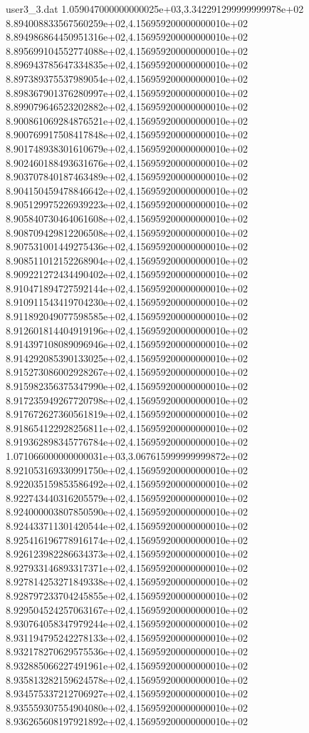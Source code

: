 \begin{filecontents}{user3_3.dat}
1.059047000000000025e+03,3.342291299999999978e+02
8.894008833567560259e+02,4.156959200000000010e+02
8.894986864450951316e+02,4.156959200000000010e+02
8.895699104552774088e+02,4.156959200000000010e+02
8.896943785647334835e+02,4.156959200000000010e+02
8.897389375537989054e+02,4.156959200000000010e+02
8.898367901376280997e+02,4.156959200000000010e+02
8.899079646523202882e+02,4.156959200000000010e+02
8.900861069284876521e+02,4.156959200000000010e+02
8.900769917508417848e+02,4.156959200000000010e+02
8.901748938301610679e+02,4.156959200000000010e+02
8.902460188493631676e+02,4.156959200000000010e+02
8.903707840187463489e+02,4.156959200000000010e+02
8.904150459478846642e+02,4.156959200000000010e+02
8.905129975226939223e+02,4.156959200000000010e+02
8.905840730464061608e+02,4.156959200000000010e+02
8.908709429812206508e+02,4.156959200000000010e+02
8.907531001449275436e+02,4.156959200000000010e+02
8.908511012152268904e+02,4.156959200000000010e+02
8.909221272434490402e+02,4.156959200000000010e+02
8.910471894727592144e+02,4.156959200000000010e+02
8.910911543419704230e+02,4.156959200000000010e+02
8.911892049077598585e+02,4.156959200000000010e+02
8.912601814404919196e+02,4.156959200000000010e+02
8.914397108089096946e+02,4.156959200000000010e+02
8.914292085390133025e+02,4.156959200000000010e+02
8.915273086002928267e+02,4.156959200000000010e+02
8.915982356375347990e+02,4.156959200000000010e+02
8.917235949267720798e+02,4.156959200000000010e+02
8.917672627360561819e+02,4.156959200000000010e+02
8.918654122928256811e+02,4.156959200000000010e+02
8.919362898345776784e+02,4.156959200000000010e+02
1.071066000000000031e+03,3.067615999999999872e+02
8.921053169330991750e+02,4.156959200000000010e+02
8.922035159853586492e+02,4.156959200000000010e+02
8.922743440316205579e+02,4.156959200000000010e+02
8.924000003807850590e+02,4.156959200000000010e+02
8.924433711301420544e+02,4.156959200000000010e+02
8.925416196778916174e+02,4.156959200000000010e+02
8.926123982286634373e+02,4.156959200000000010e+02
8.927933146893317371e+02,4.156959200000000010e+02
8.927814253271849338e+02,4.156959200000000010e+02
8.928797233704245855e+02,4.156959200000000010e+02
8.929504524257063167e+02,4.156959200000000010e+02
8.930764058347979244e+02,4.156959200000000010e+02
8.931194795242278133e+02,4.156959200000000010e+02
8.932178270629575536e+02,4.156959200000000010e+02
8.932885066227491961e+02,4.156959200000000010e+02
8.935813282159624578e+02,4.156959200000000010e+02
8.934575337212706927e+02,4.156959200000000010e+02
8.935559307554904080e+02,4.156959200000000010e+02
8.936265608197921892e+02,4.156959200000000010e+02

\end{filecontents}
